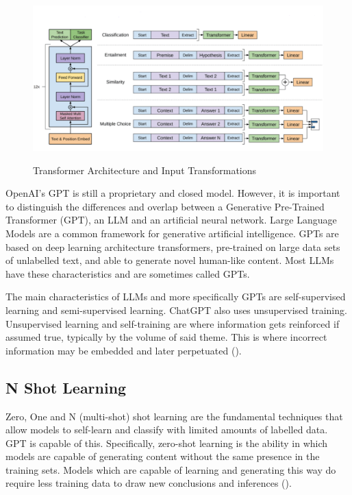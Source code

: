 \documentclass[12pt]{article}
\begin{document}
\begin{figure}[H]
    \centering
    \includegraphics[width=1\linewidth]{Images/gpt.png}
    \caption{Transformer Architecture and Input Transformations}
    \label{fig:TrainingGPT}
    \cite{radford-no-date}
\end{figure}

OpenAI’s GPT is still a proprietary and closed model. However, it is important to distinguish the differences and overlap between a Generative Pre-Trained Transformer (GPT), an LLM and an artificial neural network. Large Language Models are a common framework for generative artificial intelligence. GPTs are based on deep learning architecture transformers, pre-trained on large data sets of unlabelled text, and able to generate novel human-like content. Most LLMs have these characteristics and are sometimes called GPTs. 

The main characteristics of LLMs and more specifically GPTs are self-supervised learning and semi-supervised learning. ChatGPT also uses unsupervised training. Unsupervised learning and self-training are where information gets reinforced if assumed true, typically by the volume of said theme. This is where incorrect information may be embedded and later perpetuated (\cite{atkinson-2023}). 

\subsection{N Shot Learning}

Zero, One and N (multi-shot) shot learning are the fundamental techniques that allow models to self-learn and classify with limited amounts of labelled data. GPT is capable of this. Specifically, zero-shot learning is the ability in which models are capable of generating content without the same presence in the training sets. Models which are capable of learning and generating this way do require less training data to draw new conclusions and inferences (\cite{sacolick-2023}).  
\end{document}
